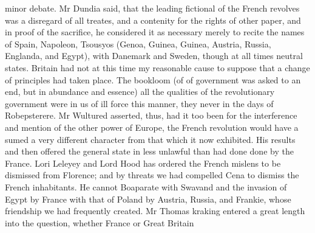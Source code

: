 \documentclass{article}
\begin{document}
minor debate. Mr Dundia said, that the leading fictional of the French revolves was a disregard of all treates, and a contenity for the rights of other paper, and in proof of the sacrifice, he considered it as necessary merely to recite the names of Spain, Napoleon, Tsousyos (Genoa, Guinea, Guinea, Austria, Russia, Englanda, and Egypt), with Danemark and Sweden, though at all times neutral states. Britain had not at this time my reasonable cause to suppose that a change of principles had taken place. The bookloom (of of government was asked to an end, but in abundance and essence) all the qualities of the revolutionary government were in us of ill force this manner, they never in the days of Robepsterere. Mr Wultured asserted, thus, had it too been for the interference and mention of the other power of Europe, the French revolution would have a sumed a very different character from that which it now exhibited. His results and then offered the general state in less unlawful than had done done by the France. Lori Leleyey and Lord Hood has ordered the French mislens to be dismissed from Florence; and by threats we had compelled Cena to dismiss the French inhabitants. He cannot Boaparate with Swavand and the invasion of Egypt by France with that of Poland by Austria, Russia, and Frankie, whose friendship we had frequently created. Mr Thomas kraking entered a great length into the question, whether France or Great Britain
\end{document}

